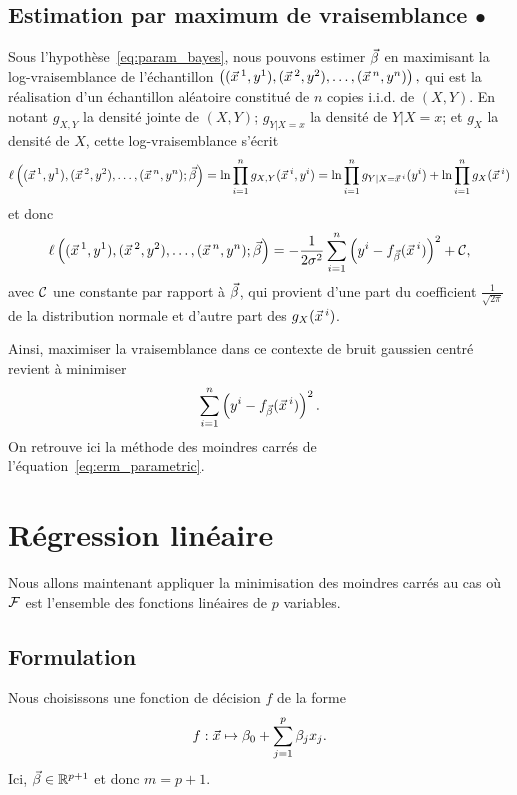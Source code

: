 \subsection{Estimation par maximum de vraisemblance $\bullet$}
\label{sec:least_squares}
Sous l'hypothèse~\eqref{eq:param_bayes}, nous pouvons estimer $\bbeta$ en
maximisant la log-vraisemblance de l'échantillon
$\left((\xx^1, y^1), (\xx^2, y^2), \dots, (\xx^n, y^n) \right), $ qui est la
réalisation d'un échantillon aléatoire constitué de $n$ copies i.i.d. de
$(X, Y)$.  En notant $g_{X,Y}$ la densité jointe de $(X, Y)$; $g_{Y|X=x}$ la
densité de $Y|X=x$; et $g_X$ la densité de $X$, cette log-vraisemblance s'écrit
\begin{equation*}
  \ell\left((\xx^1, y^1), (\xx^2, y^2), \dots, (\xx^n, y^n); \bbeta  \right)
  = \ln \prod_{i=1}^n g_{X, Y}(\xx^i, y^i) 
  = \ln \prod_{i=1}^n g_{Y|X=\xx^i}(y^i) + \ln \prod_{i=1}^n
  g_X(\xx^i)
\end{equation*}
et donc    
\begin{equation*}
  \ell\left((\xx^1, y^1), (\xx^2, y^2), \dots, (\xx^n, y^n); \bbeta  \right)
  = - \frac1{2\sigma^2} \sum_{i=1}^n \left(y^i -
    f_{\bbeta}(\xx^i) \right)^2 + \Ccal,
\end{equation*}
avec $\mathcal{C}$ une constante par rapport à $\bbeta$, qui provient d'une part du
coefficient $\frac1{\sqrt{2\pi}}$ de la distribution normale et d'autre part
des $g_X(\xx^i)$.

Ainsi, maximiser la vraisemblance dans ce contexte de bruit gaussien centré
revient à minimiser 
\[\sum_{i=1}^n \left(y^i - f_{\bbeta}(\xx^i) \right)^2.\]
On retrouve ici la méthode des moindres carrés de l'équation~\eqref{eq:erm_parametric}.

\section{Régression linéaire}
\label{sec:linreg}
Nous allons maintenant appliquer la minimisation des moindres carrés au cas où
$\mathcal{F}$ est l'ensemble des fonctions linéaires de $p$ variables.

\subsection{Formulation}
Nous choisissons une fonction de décision $f$ de la forme
\begin{equation}
  \label{eq:linear_decision}
  f: \xx \mapsto \beta_0 + \sum_{j=1}^p \beta_j x_j.
\end{equation}
Ici, $\bbeta \in \RR^{p+1}$ et donc $m=p+1$.

